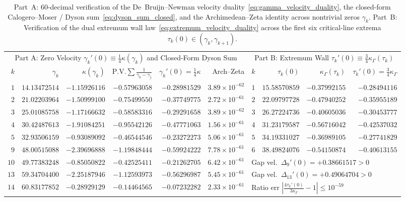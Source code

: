 \documentclass[11pt,reqno]{amsart}
\theoremstyle{definition}
\theoremstyle{remark}
\numberwithin{equation}{section}
\newcommand{\PV}{\mathrm{P.V.}}
\begin{document}
\begin{table}[t]
\centering
\caption{Part~A: $60$-decimal verification of the De~Bruijn--Newman velocity duality~\eqref{eq:gamma_velocity_duality}, the closed-form Calogero--Moser / Dyson sum~\eqref{eq:dyson_sum_closed}, and the Archimedean--Zeta identity across nontrivial zeros $\gamma_k$. Part~B: Verification of the dual extremum wall law~\eqref{eq:extremum_velocity_duality} across the first six critical-line extrema $\tau_k(0) \in (\gamma_k, \gamma_{k+1})$.}\label{tab:chladni_velocity}
\scriptsize
\setlength{\tabcolsep}{2.5pt}
\begin{tabular}{@{}rrrrrr|rrrr@{}}
\toprule
\multicolumn{6}{c|}{Part A: Zero Velocity $\gamma_k'(0) \equiv \frac{1}{4}\kappa(\gamma_k)$ and Closed-Form Dyson Sum} & \multicolumn{4}{c}{Part B: Extremum Wall $\tau_k'(0) \equiv \frac{3}{4}\kappa_\Gamma(\tau_k)$} \\
$k$ & $\gamma_k$ & $\kappa(\gamma_k)$ & $\PV\sum\frac{1}{\gamma_k-\gamma_j}$ & $\gamma_k'(0) = \frac{1}{4}\kappa$ & Arch--Zeta & $k$ & $\tau_k(0)$ & $\kappa_\Gamma(\tau_k)$ & $\tau_k'(0) = \frac{3}{4}\kappa_\Gamma$ \\
\midrule
$1$  & $14.13472514$ & $-1.15926116$ & $-0.57963058$ & $-0.28981529$ & $3.89\times 10^{-62}$ & $1$ & $15.58570859$ & $-0.37992155$ & $-0.28494116$ \\
$2$  & $21.02203964$ & $-1.50999100$ & $-0.75499550$ & $-0.37749775$ & $2.72\times 10^{-61}$ & $2$ & $22.09797728$ & $-0.47940252$ & $-0.35955189$ \\
$3$  & $25.01085758$ & $-1.17166632$ & $-0.58583316$ & $-0.29291658$ & $3.89\times 10^{-62}$ & $3$ & $26.27224736$ & $-0.40605036$ & $-0.30453777$ \\
$4$  & $30.42487613$ & $-1.91084251$ & $-0.95542126$ & $-0.47771063$ & $1.56\times 10^{-61}$ & $4$ & $31.23179587$ & $-0.56716042$ & $-0.42537032$ \\
$5$  & $32.93506159$ & $-0.93089092$ & $-0.46544546$ & $-0.23272273$ & $5.06\times 10^{-61}$ & $5$ & $34.19331027$ & $-0.36989105$ & $-0.27741829$ \\
$9$  & $48.00515088$ & $-2.39696888$ & $-1.19848444$ & $-0.59924222$ & $7.78\times 10^{-61}$ & $6$ & $38.49824076$ & $-0.54150874$ & $-0.40613155$ \\
$10$ & $49.77383248$ & $-0.85050822$ & $-0.42525411$ & $-0.21262705$ & $6.42\times 10^{-61}$ & \multicolumn{4}{l}{Gap vel.\ $\Delta_9'(0) = +0.38661517 > 0$} \\
$13$ & $59.34704400$ & $-2.25187946$ & $-1.12593973$ & $-0.56296987$ & $5.45\times 10^{-61}$ & \multicolumn{4}{l}{Gap vel.\ $\Delta_{13}'(0) = +0.49064704 > 0$} \\
$14$ & $60.83177852$ & $-0.28929129$ & $-0.14464565$ & $-0.07232282$ & $2.33\times 10^{-61}$ & \multicolumn{4}{l}{Ratio err $|\frac{4\tau_k'(0)}{3\kappa_\Gamma}-1| \le 10^{-59}$} \\
\bottomrule
\end{tabular}
\end{table}
\end{document}
